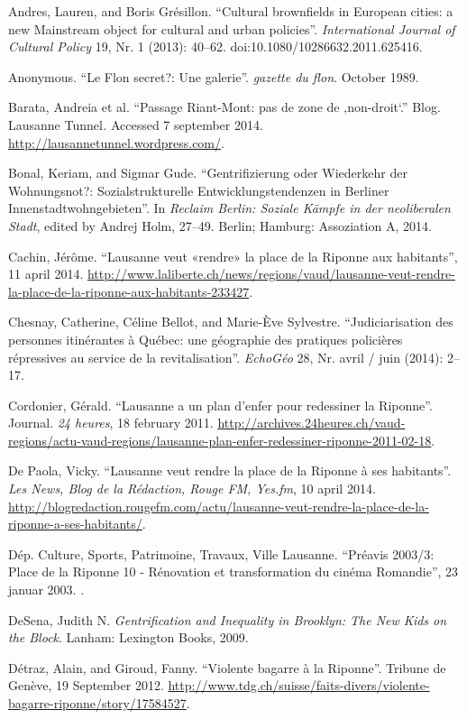 \documentclass[a4paper,
fontsize=11pt,
oneside,
numbers=noperiodatend,
parskip=half-,
bibliography=totoc,
final
]{scrartcl}
\begin{document}
Andres, Lauren, and Boris Grésillon. \enquote{Cultural brownfields in
European cities: a new Mainstream object for cultural and urban
policies}. \emph{International Journal of Cultural Policy} 19, Nr. 1
(2013): 40--62. doi:10.1080/10286632.2011.625416.

Anonymous. \enquote{Le Flon secret?: Une galerie}. \emph{gazette du
flon}. October 1989.

Barata, Andreia et al. \enquote{Passage Riant-Mont: pas de zone de
‚non-droit`.} Blog. Lausanne Tunnel\emph{.} Accessed 7 september 2014.
\url{http://lausannetunnel.wordpress.com/}.

Bonal, Keriam, and Sigmar Gude. \enquote{Gentrifizierung oder Wiederkehr
der Wohnungsnot?: Sozialstrukturelle Entwicklungstendenzen in Berliner
Innenstadtwohngebieten}. In \emph{Reclaim Berlin: Soziale Kämpfe in der
neoliberalen Stadt}, edited by Andrej Holm, 27--49. Berlin; Hamburg:
Assoziation A, 2014.

Cachin, Jérôme. \enquote{Lausanne veut «rendre» la place de la Riponne
aux habitants}, 11 april 2014.
\url{http://www.laliberte.ch/news/regions/vaud/lausanne-veut-rendre-la-place-de-la-riponne-aux-habitants-233427}.

Chesnay, Catherine, Céline Bellot, and Marie-Ève Sylvestre.
\enquote{Judiciarisation des personnes itinérantes à Québec: une
géographie des pratiques policières répressives au service de la
revitalisation}. \emph{EchoGéo} 28, Nr. avril / juin (2014): 2--17.

Cordonier, Gérald. \enquote{Lausanne a un plan d'enfer pour redessiner
la Riponne}. Journal. \emph{24 heures}, 18 february 2011.
\url{http://archives.24heures.ch/vaud-regions/actu-vaud-regions/lausanne-plan-enfer-redessiner-riponne-2011-02-18}.

De Paola, Vicky. \enquote{Lausanne veut rendre la place de la Riponne à
ses habitants}. \emph{Les News, Blog de la Rédaction, Rouge FM, Yes.fm},
10 april 2014.
\url{http://blogredaction.rougefm.com/actu/lausanne-veut-rendre-la-place-de-la-riponne-a-ses-habitants/}.

Dép. Culture, Sports, Patrimoine, Travaux, Ville Lausanne.
\enquote{Préavis 2003/3: Place de la Riponne 10 - Rénovation et
transformation du cinéma Romandie}, 23 januar 2003. .

DeSena, Judith N. \emph{Gentrification and Inequality in Brooklyn: The
New Kids on the Block}. Lanham: Lexington Books, 2009.

Détraz, Alain, and Giroud, Fanny. \enquote{Violente bagarre à la
Riponne}. Tribune de Genève, 19 September 2012.
\url{http://www.tdg.ch/suisse/faits-divers/violente-bagarre-riponne/story/17584527}.
\end{document}
